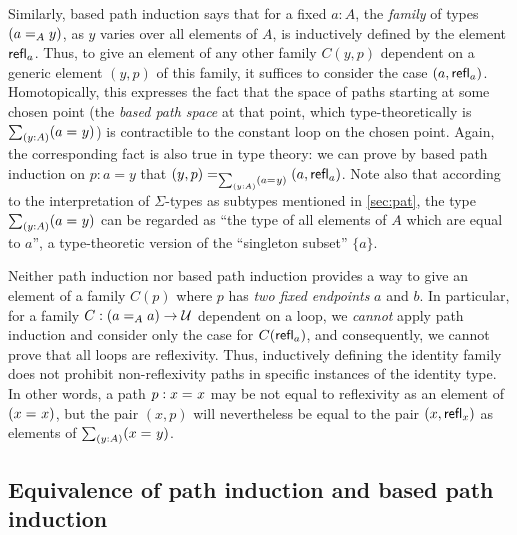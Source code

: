 \begin{rmk}
Similarly, based path induction says that for a fixed $a:A$, the \emph{family} of types $(\id[A]{a}{y})$, as $y$ varies over all elements of $A$, is inductively defined by the element $\refl{a}$.
Thus, to give an element of any other family $C(y,p)$ dependent on a generic element $(y,p)$ of this family, it suffices to consider the case $(a,\refl{a})$.
Homotopically, this expresses the fact that the space of paths starting at some chosen point (the \emph{based path space} at that point, which type-theoretically is $\sm{y:A} (\id{a}{y})$) is contractible to the constant loop on the chosen point.
Again, the corresponding fact is also true in type theory: we can prove by based path induction on $p:a=y$ that $\id[\sm{y:A}(\id{a}{y})]{(y,p)}{(a,\refl{a})}$.
Note also that according to the interpretation of $\Sigma$-types as subtypes mentioned in \cref{sec:pat}, the type $\sm{y:A}(\id{a}{y})$ can be regarded as ``the type of all elements of $A$ which are equal to $a$'', a type-theoretic version of the ``singleton subset'' $\{a\}$.

Neither path induction nor based path induction provides a way to give an element of a family $C(p)$ where $p$ has \emph{two fixed endpoints} $a$ and $b$.
In particular, for a family $C: (\id[A]{a}{a}) \to \UU$ dependent on a loop, we \emph{cannot} apply path induction and consider only the case for $C(\refl{a})$, and consequently, we cannot prove that all loops are reflexivity.
Thus, inductively defining the identity family does not prohibit non-reflexivity paths in specific instances of the identity type.
In other words, a path $p:\id{x}{x}$ may  be not equal to reflexivity as an element of $(\id{x}{x})$, but the pair $(x,p)$ will nevertheless be equal to the pair $(x,\refl{x})$ as elements of $\sm{y:A}(\id{x}{y})$.
\end{rmk}

%
%

\subsection{Equivalence of path induction and based path induction}

